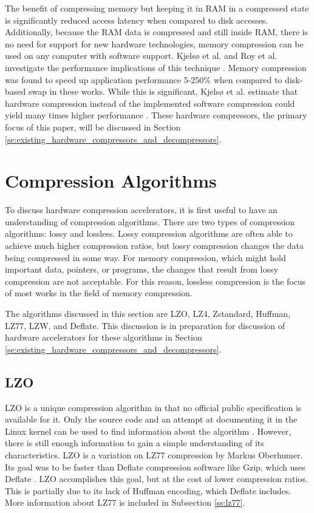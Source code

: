 \documentclass[doublespace,nopageskip]{VTthesis}
\begin{document}
The benefit of compressing memory but keeping it in RAM in a compressed state is significantly reduced access latency when compared to disk accesses. Additionally, because the RAM data is compressed and still inside RAM, there is no need for support for new hardware technologies, memory compression can be used on any computer with software support. Kjelsø et al. and Roy et al. investigate the performance implications of this technique \cite{memorycompressionperformance, compressedmemoryimproveperformance}. Memory compression was found to speed up application performance 5-250\% when compared to disk-based swap in these works. While this is significant, Kjelsø et al. estimate that hardware compression instead of the implemented software compression could yield many times higher performance \cite{memorycompressionperformance}. These hardware compressors, the primary focus of this paper, will be discussed in Section \ref{se:existing_hardware_compressors_and_decompressors}.

\section{Compression Algorithms}\label{se:compression_algorithms}
To discuss hardware compression accelerators, it is first useful to have an understanding of compression algorithms. There are two types of compression algorithms: lossy and lossless. Lossy compression algorithms are often able to achieve much higher compression ratios, but lossy compression changes the data being compressed in some way. For memory compression, which might hold important data, pointers, or programs, the changes that result from lossy compression are not acceptable. For this reason, lossless compression is the focus of most works in the field of memory compression.

The algorithms discussed in this section are LZO, LZ4, Zstandard, Huffman, LZ77, LZW, and Deflate. This discussion is in preparation for discussion of hardware accelerators for these algorithms in Section \ref{se:existing_hardware_compressors_and_decompressors}.

\subsection{LZO}\label{ss:lzo}
LZO is a unique compression algorithm in that no official public specification is available for it. Only the source code and an attempt at documenting it in the Linux kernel can be used to find information about the algorithm \cite{linuxlzo}. However, there is still enough information to gain a simple understanding of its characteristics. LZO is a variation on LZ77 compression by Markus Oberhumer. Its goal was to be faster than Deflate compression software like Gzip, which uses Deflate \cite{lzo}. LZO accomplishes this goal, but at the cost of lower compression ratios. This is partially due to its lack of Huffman encoding, which Deflate includes. More information about LZ77 is included in Subsection \ref{ss:lz77}.
\end{document}

